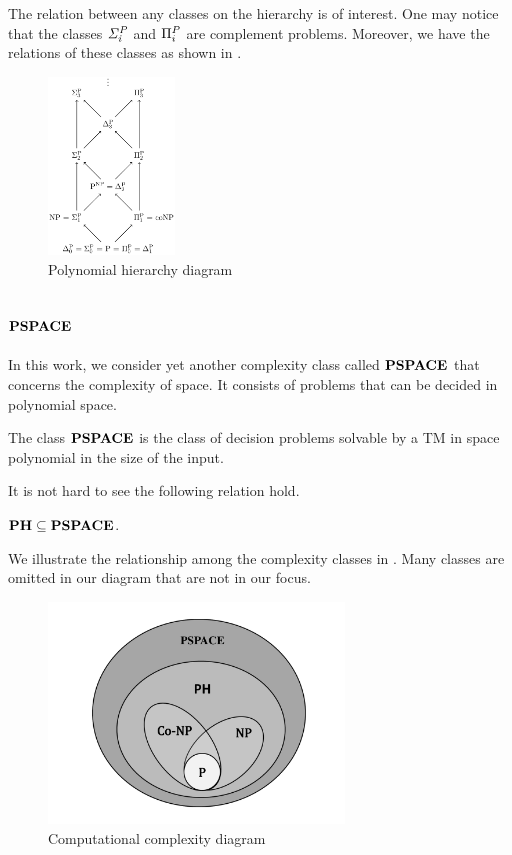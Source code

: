 The relation between any classes on the hierarchy is of interest.
One may notice that the classes $\mathit{\Sigma^P_{i}}$ and $\Pi^P_{i}$ are
complement problems.
Moreover, we have the relations of these classes as shown in .

\begin{figure}[h!]
  \centering
  \includegraphics[width=0.3\textwidth]{img/ph_diagram.png}
  \caption{Polynomial hierarchy diagram \label{fig:ph_diagram}}
\end{figure}


\subsection{$\textbf{PSPACE}$}
In this work, we consider yet another complexity class called $\textbf{PSPACE}$ that
concerns the complexity of space.
It consists of problems that can be decided in polynomial space.

\begin{definition}
	The class $\textbf{PSPACE}$ is the class of decision problems solvable by a TM
	in space polynomial in the size of the input.
\end{definition}
It is not hard to see the following relation hold.
\begin{center}
	$\textbf{PH} \subseteq \textbf{PSPACE}$.
\end{center}

We illustrate the relationship among the complexity classes in
. Many classes are omitted in our diagram
that are not in our focus.

\begin{figure}[h!]
  \centering
  \includegraphics[width=0.7\textwidth]{img/comp_diagram.pdf}
  \caption{Computational complexity diagram \label{fig:comp_diagram}}
\end{figure}

